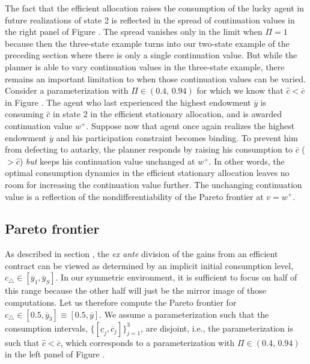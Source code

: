 The fact that the efficient allocation raises the consumption of
the lucky agent in future realizations of state 2 is reflected in
the
spread of continuation values in the right panel of Figure %
. The spread vanishes only in the limit when $\Pi=1$
because then the three-state example turns into our two-state
example of the preceding section where there is only a single
continuation value. But while the planner is able to vary
continuation values in the three-state example, there remains an
important limitation to when those continuation values can be
varied. Consider a parameterization with $\Pi\in(0.4,\, 0.94)$ for
which we know that $\hat c < \overline c$ in  Figure
. The agent who last experienced the highest
endowment $\overline y$ is consuming $\hat c$ in state 2 in the
efficient stationary allocation, and is awarded continuation value
$w^+$. Suppose now that agent  once again realizes the highest
endowment $\overline y$ and his participation constraint becomes
binding.  To prevent him from defecting to autarky, the planner
responds by raising his consumption to $\overline c$ ($> \hat c$)
{\it but\/} keeps his continuation value unchanged at $w^+$. In
other words, the optimal consumption dynamics in the efficient
stationary allocation leaves no room for increasing the
continuation value  further.
The unchanging continuation value is a reflection of the
nondifferentiability of the Pareto frontier at $v=w^+$.


\subsection{Pareto frontier}
As described in section ,
the {\it ex ante} division of the gains from
an efficient contract can be viewed as determined by an implicit
initial  consumption level, $c_{\triangle}\in[\overline y_1,
\overline y_S]$. In our symmetric environment, it is
sufficient to focus on half of this range because the other half
will just be the mirror image of those computations. Let us
therefore compute the Pareto frontier for $c_{\triangle}\in[0.5,
\overline y_3]\equiv[0.5, \overline y]$. We assume a
parameterization such that the consumption intervals,
$\{[\underline c_j, \overline c_j]\}_{j=1}^3$, are disjoint, i.e.,
the parameterization is such that $\hat c < \overline c$, which
corresponds to a parameterization with $\Pi\in(0.4,\, 0.94)$
in the left panel of Figure %
.

